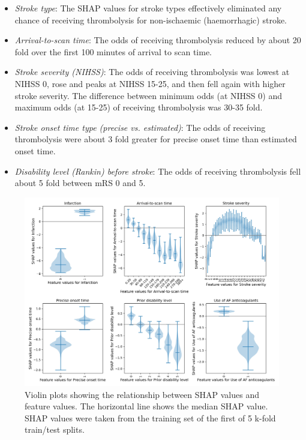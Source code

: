 \begin{itemize}
    \item \emph{Stroke type}: The SHAP values for stroke types effectively eliminated any chance of receiving thrombolysis for non-ischaemic (haemorrhagic) stroke.
    \item \emph{Arrival-to-scan time}: The odds of receiving thrombolysis reduced by about 20 fold over the first 100 minutes of arrival to scan time.
    \item \emph{Stroke severity (NIHSS)}: The odds of receiving thrombolysis was lowest at NIHSS 0, rose and peaks at NIHSS 15-25, and then fell again with higher stroke severity. The difference between minimum odds (at NIHSS 0) and maximum odds (at 15-25) of receiving thrombolysis was 30-35 fold.
    \item \emph{Stroke onset time type (precise vs. estimated)}: The odds of receiving thrombolysis were about 3 fold greater for precise onset time than estimated onset time.
    \item \emph{Disability level (Rankin) before stroke}: The odds of receiving thrombolysis fell about 5 fold between mRS 0 and 5.
\end{itemize}


\begin{figure}
\centering
\includegraphics[width=1\textwidth]{./images/03_xgb_10_features_thrombolysis_shap_violin}
\caption{Violin plots showing the relationship between SHAP values and feature values. The horizontal line shows the median SHAP value. SHAP values were taken from the training set of the first of 5 k-fold train/test splits.}
\label{fig:results_shap_violin}
\end{figure}

